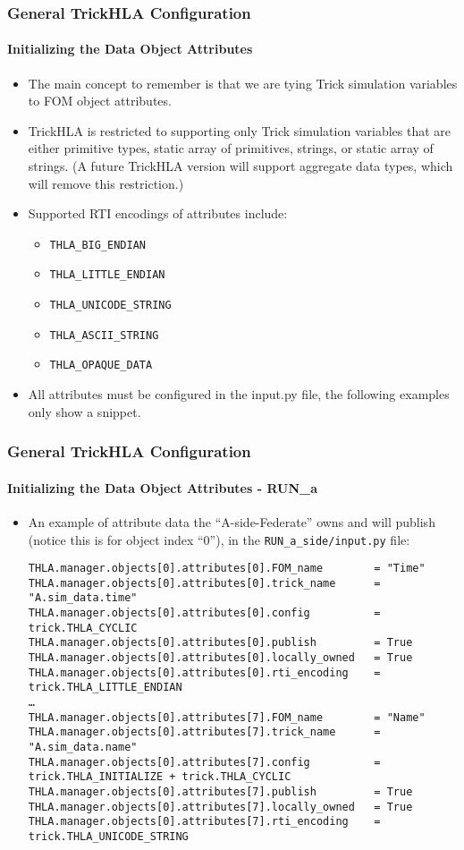    \begin{frame}
      \frametitle{General TrickHLA Configuration}
      \framesubtitle{Initializing the Data Object Attributes}
      \begin{itemize}
         \item The main concept to remember is that we are tying Trick simulation
         variables to FOM object attributes.
         \item TrickHLA is restricted to supporting only Trick simulation
         variables that are either primitive types, static array of primitives,
         strings, or static array of strings. (A future TrickHLA version will
         support aggregate data types, which will remove this restriction.)
         \item Supported RTI encodings of attributes include:
         \begin{itemize}
            \item \texttt{THLA\_BIG\_ENDIAN}
            \item \texttt{THLA\_LITTLE\_ENDIAN}
            \item \texttt{THLA\_UNICODE\_STRING}
            \item \texttt{THLA\_ASCII\_STRING}
            \item \texttt{THLA\_OPAQUE\_DATA}
         \end{itemize}
         \item All attributes must be configured in the input.py file, the
         following examples only show a snippet.
      \end{itemize}
   \end{frame}
   
   \begin{frame}[fragile]
      \frametitle{General TrickHLA Configuration}
      \framesubtitle{Initializing the Data Object Attributes - RUN\_a}
      \begin{itemize}
         \item An example of attribute data the “A-side-Federate” owns and will
         publish (notice this is for object index “0”), in the
         \texttt{RUN\_a\_side/input.py} file:
\begin{Verbatim}[frame=single, fontsize=\tiny]
THLA.manager.objects[0].attributes[0].FOM_name        = "Time"
THLA.manager.objects[0].attributes[0].trick_name      = "A.sim_data.time"
THLA.manager.objects[0].attributes[0].config          = trick.THLA_CYCLIC
THLA.manager.objects[0].attributes[0].publish         = True
THLA.manager.objects[0].attributes[0].locally_owned   = True
THLA.manager.objects[0].attributes[0].rti_encoding    = trick.THLA_LITTLE_ENDIAN
…
THLA.manager.objects[0].attributes[7].FOM_name        = "Name"
THLA.manager.objects[0].attributes[7].trick_name      = "A.sim_data.name"
THLA.manager.objects[0].attributes[7].config          = trick.THLA_INITIALIZE + trick.THLA_CYCLIC
THLA.manager.objects[0].attributes[7].publish         = True
THLA.manager.objects[0].attributes[7].locally_owned   = True
THLA.manager.objects[0].attributes[7].rti_encoding    = trick.THLA_UNICODE_STRING
\end{Verbatim}
      \end{itemize}
   \end{frame}
   
